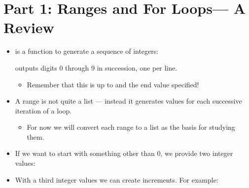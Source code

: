 \documentclass[letterpaper,10pt,english]{sphinxmanual}
\begin{document}
\section{Part 1: Ranges and For Loops— A Review}
\label{\detokenize{lecture_notes/lec12_loops2_for_double:part-1-ranges-and-for-loops-a-review}}\begin{itemize}
\item {} 
 is a function to generate a sequence of integers:

\begin{sphinxVerbatim}[commandchars=\\\{\}]
   
\end{sphinxVerbatim}

outputs digits 0 through 9 in succession, one per line.
\begin{itemize}
\item {} 
Remember that this is up to and  the end
value specified!

\end{itemize}

\item {} 
A range is not quite a list — instead it generates values for each
successive iteration of a  loop.
\begin{itemize}
\item {} 
For now we will convert each range to a list as the basis for
studying them.

\end{itemize}

\item {} 
If we want to start with something other than 0, we provide two
integer values:

\begin{sphinxVerbatim}[commandchars=\\\{\}]
 
\end{sphinxVerbatim}

\item {} 
With a third integer values we can create increments. For example:

\begin{sphinxVerbatim}[commandchars=\\\{\}]
  
\end{sphinxVerbatim}


\end{itemize}
\end{document}
